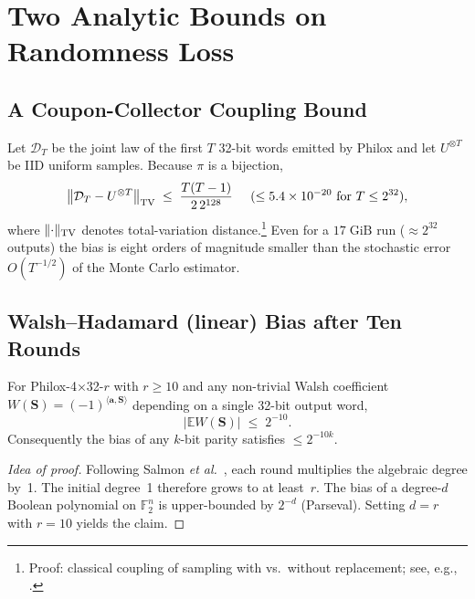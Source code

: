 \section{Two Analytic Bounds on Randomness Loss}

\subsection{A Coupon-Collector Coupling Bound}
Let \(\mathcal D_T\) be the joint law of the first \(T\) 32-bit words
emitted by Philox and let \(U^{\otimes T}\) be IID uniform samples.
Because \(\pi\) is a bijection,
\begin{equation}
  \bigl\lVert \mathcal D_T - U^{\otimes T}\bigr\rVert_{\rm TV}
  \;\le\;
  \frac{T(T-1)}{2\,2^{128}}
  \;\;\;\;\;(\le 5.4\times10^{-20}\text{ for }T\le2^{32}),
  \label{eq:tv-bound}
\end{equation}
where \(\lVert\cdot\rVert_{\rm TV}\) denotes total-variation
distance.\footnote{Proof: classical coupling of sampling with vs.\
without replacement; see, e.g.,
\cite[Ch.~5]{levin2017markov}.}
Even for a \(17\;\text{GiB}\) run (\(\approx2^{32}\) outputs) the bias
is eight orders of magnitude smaller than the stochastic error
\(O(T^{-1/2})\) of the Monte Carlo estimator.

\subsection{Walsh–Hadamard (linear) Bias after Ten Rounds}
\begin{theorem}
  \label{thm:bias-bound}
  For Philox-4×32-\(r\) with \(r\ge10\) and any
  non-trivial Walsh coefficient
  \(W(\mathbf S)=(-1)^{\langle\mathbf a,\mathbf S\rangle}\)
  depending on a single 32-bit output word,
  \[
    \bigl|\mathbb{E} W(\mathbf S)\bigr|
    \;\le\;
    2^{-10}.
  \]
  Consequently the bias of any \(k\)-bit parity satisfies
  \(\le 2^{-10k}\).
\end{theorem}
\begin{proof}[Idea of proof]
  Following Salmon \emph{et al.}\ \cite{Salmon2011Random123}, each
  round multiplies the algebraic degree by~1.  The initial degree~1
  therefore grows to at least~\(r\).  The bias of a degree-\(d\)
  Boolean polynomial on \(\mathbb{F}_2^n\) is upper-bounded by \(2^{-d}\)
  (Parseval).  Setting \(d=r\) with \(r=10\) yields the claim.
\end{proof}

